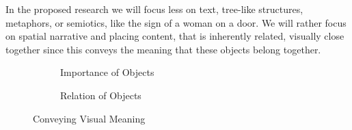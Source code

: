 \documentclass[twoside, 12pt]{article}
\begin{document}
In the proposed research we will focus less on text, tree-like structures, metaphors, or semiotics, like the sign of a woman on a door. We will rather focus on spatial narrative and placing content, that is inherently related, visually close together since this conveys the meaning that these objects belong together.\\

\begin{figure}[H]
        \centering
        \begin{subfigure}[b]{0.3\textwidth}
                \caption{Importance of Objects}
                \label{fig:imp_objects}
        \end{subfigure}%
        \qquad %
        \begin{subfigure}[b]{0.3\textwidth}
                \caption{Relation of Objects}
                \label{fig:rel_objects}
        \end{subfigure}
        \caption{Conveying Visual Meaning}\label{fig:Objects}
\end{figure}
\end{document}
